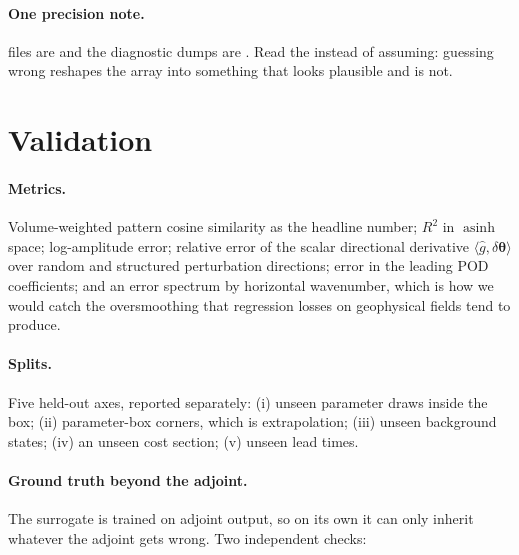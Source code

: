 \paragraph{One precision note.}  files are  and the
 diagnostic dumps are . Read the  instead
of assuming: guessing wrong reshapes the array into something that looks
plausible and is not.

\section{Validation}
\label{sec:val}

\paragraph{Metrics.} Volume-weighted pattern cosine similarity as the headline
number; $R^{2}$ in $\operatorname{asinh}$ space; log-amplitude error; relative
error of the scalar directional derivative
$\langle\hat{g},\delta\boldsymbol\theta\rangle$ over random and structured
perturbation directions; error in the leading POD coefficients; and an error
spectrum by horizontal wavenumber, which is how we would catch the
oversmoothing that regression losses on geophysical fields tend to produce.

\paragraph{Splits.} Five held-out axes, reported separately: (i) unseen
parameter draws inside the box; (ii) parameter-box corners, which is
extrapolation; (iii) unseen background states; (iv) an unseen cost section;
(v) unseen lead times.

\paragraph{Ground truth beyond the adjoint.}
The surrogate is trained on adjoint output, so on its own it can only inherit
whatever the adjoint gets wrong. Two independent checks:

